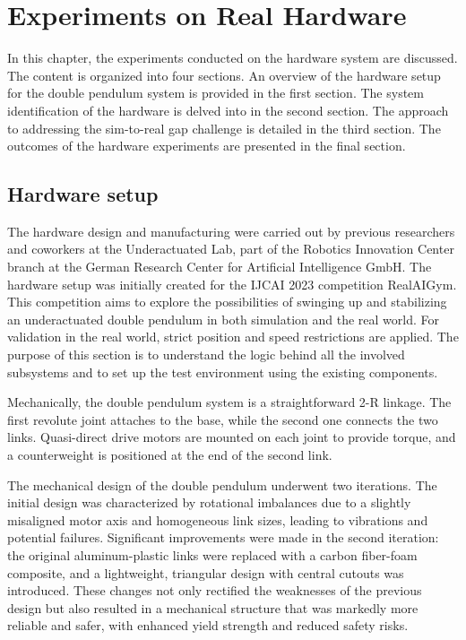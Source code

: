 \chapter{Experiments on Real Hardware}
In this chapter, the experiments conducted on the hardware system are discussed. The content is organized into four sections. An overview of the hardware setup for the double pendulum system is provided in the first section. The system identification of the hardware is delved into in the second section. The approach to addressing the sim-to-real gap challenge is detailed in the third section. The outcomes of the hardware experiments are presented in the final section.

\section{Hardware setup}
The hardware design and manufacturing were carried out by previous researchers and coworkers at the Underactuated Lab, part of the Robotics Innovation Center branch at the German Research Center for Artificial Intelligence GmbH. The hardware setup was initially created for the IJCAI 2023 competition RealAIGym\cite{dfki_ric_underactuated_lab_2023}. This competition aims to explore the possibilities of swinging up and stabilizing an underactuated double pendulum in both simulation and the real world. For validation in the real world, strict position and speed restrictions are applied. The purpose of this section is to understand the logic behind all the involved subsystems and to set up the test environment using the existing components.

Mechanically, the double pendulum system is a straightforward 2-R linkage. The first revolute joint attaches to the base, while the second one connects the two links. Quasi-direct drive motors are mounted on each joint to provide torque, and a counterweight is positioned at the end of the second link.

The mechanical design of the double pendulum underwent two iterations. The initial design was characterized by rotational imbalances due to a slightly misaligned motor axis and homogeneous link sizes, leading to vibrations and potential failures. Significant improvements were made in the second iteration: the original aluminum-plastic links were replaced with a carbon fiber-foam composite, and a lightweight, triangular design with central cutouts was introduced. These changes not only rectified the weaknesses of the previous design but also resulted in a mechanical structure that was markedly more reliable and safer, with enhanced yield strength and reduced safety risks.

